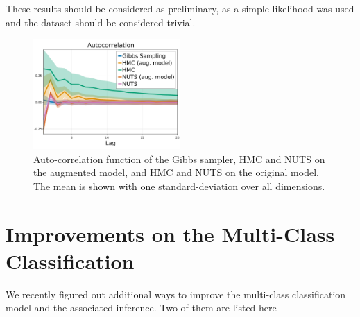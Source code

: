 These results should be considered as preliminary, as a simple likelihood was used and the dataset should be considered trivial.

\begin{figure}[H]
    \centering
    \includegraphics[width=0.5\textwidth]{./chapters/8_discussions/figures/autocorrelation.pdf}
    \caption{Auto-correlation function of the Gibbs sampler, \ac{HMC} and \ac{NUTS} on the augmented model, and \ac{HMC} and \ac{NUTS} on the original model.
    The mean is shown with one standard-deviation over all dimensions.}
    \label{fig:hmc_vs_gibbs}
\end{figure}


\section{Improvements on the Multi-Class Classification}
\label{sec:improvemulticlass}
We recently figured out additional ways to improve the multi-class classification model and the associated inference.
Two of them are listed here

